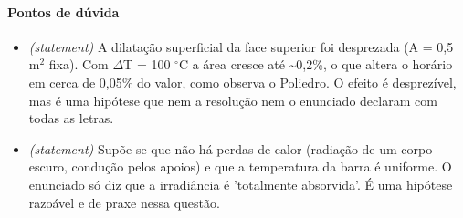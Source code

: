 \documentclass{article}%
\begin{document}
\paragraph{Pontos de dúvida}%
\begin{itemize}%
\item%
\textit{(statement)} A dilatação superficial da face superior foi desprezada (A = 0,5 m$^2$ fixa). Com $\Delta$T = 100 $^\circ$C a área cresce até \textasciitilde{}0,2\%, o que altera o horário em cerca de 0,05\% do valor, como observa o Poliedro. O efeito é desprezível, mas é uma hipótese que nem a resolução nem o enunciado declaram com todas as letras.%
\item%
\textit{(statement)} Supõe{-}se que não há perdas de calor (radiação de um corpo escuro, condução pelos apoios) e que a temperatura da barra é uniforme. O enunciado só diz que a irradiância é 'totalmente absorvida'. É uma hipótese razoável e de praxe nessa questão.%
\end{itemize}%
\end{document}
